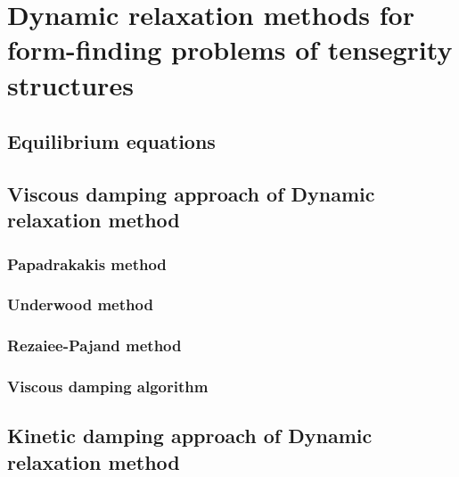 \documentclass[preprint,3p,12pt]{elsarticle}
\begin{document}
\section{Dynamic relaxation methods for form-finding problems of tensegrity structures}
\label{sec:2}

\subsection{Equilibrium equations}\label{subsec:2:1}

\subsection{Viscous damping approach of Dynamic relaxation method} \label{subsec:2:2}
\subsubsection{Papadrakakis method}
\subsubsection{Underwood method}
\subsubsection{Rezaiee-Pajand method}
\subsubsection{Viscous damping algorithm} 

\subsection{Kinetic damping approach of Dynamic relaxation method} \label{subsec:2:3}
\end{document}
